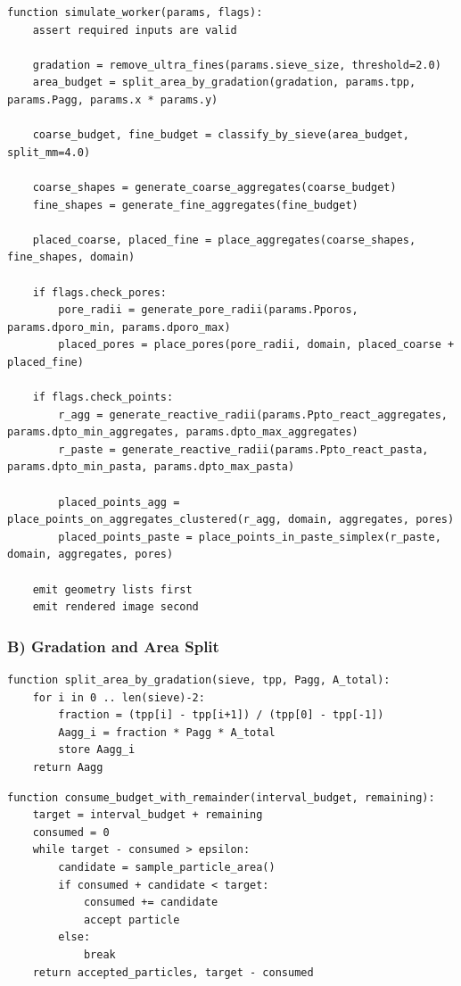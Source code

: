 ﻿\documentclass[11pt,a4paper]{article}
\begin{document}
\begin{lstlisting}[style=pseudo]
function simulate_worker(params, flags):
	assert required inputs are valid

	gradation = remove_ultra_fines(params.sieve_size, threshold=2.0)
	area_budget = split_area_by_gradation(gradation, params.tpp, params.Pagg, params.x * params.y)

	coarse_budget, fine_budget = classify_by_sieve(area_budget, split_mm=4.0)

	coarse_shapes = generate_coarse_aggregates(coarse_budget)
	fine_shapes = generate_fine_aggregates(fine_budget)

	placed_coarse, placed_fine = place_aggregates(coarse_shapes, fine_shapes, domain)

	if flags.check_pores:
		pore_radii = generate_pore_radii(params.Pporos, params.dporo_min, params.dporo_max)
		placed_pores = place_pores(pore_radii, domain, placed_coarse + placed_fine)

	if flags.check_points:
		r_agg = generate_reactive_radii(params.Ppto_react_aggregates, params.dpto_min_aggregates, params.dpto_max_aggregates)
		r_paste = generate_reactive_radii(params.Ppto_react_pasta, params.dpto_min_pasta, params.dpto_max_pasta)

		placed_points_agg = place_points_on_aggregates_clustered(r_agg, domain, aggregates, pores)
		placed_points_paste = place_points_in_paste_simplex(r_paste, domain, aggregates, pores)

	emit geometry lists first
	emit rendered image second
\end{lstlisting}


\subsubsection*{B) Gradation and Area Split}

\begin{lstlisting}[style=pseudo]
function split_area_by_gradation(sieve, tpp, Pagg, A_total):
	for i in 0 .. len(sieve)-2:
		fraction = (tpp[i] - tpp[i+1]) / (tpp[0] - tpp[-1])
		Aagg_i = fraction * Pagg * A_total
		store Aagg_i
	return Aagg
\end{lstlisting}


\begin{lstlisting}[style=pseudo]
function consume_budget_with_remainder(interval_budget, remaining):
	target = interval_budget + remaining
	consumed = 0
	while target - consumed > epsilon:
		candidate = sample_particle_area()
		if consumed + candidate < target:
			consumed += candidate
			accept particle
		else:
			break
	return accepted_particles, target - consumed
\end{lstlisting}
\end{document}
